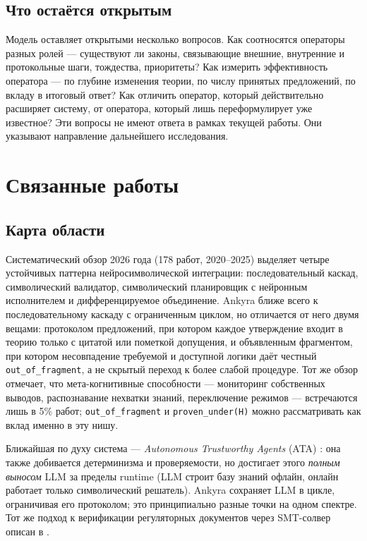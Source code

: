 \documentclass[12pt,a4paper]{article}
\begin{document}
\subsection{Что остаётся открытым}
\label{sec:open}

Модель оставляет открытыми несколько вопросов. Как соотносятся операторы разных ролей --- существуют
ли законы, связывающие внешние, внутренние и протокольные шаги, тождества, приоритеты? Как измерить 
эффективность оператора --- по глубине изменения теории, по числу принятых предложений, по вкладу
в итоговый ответ? Как отличить оператор, который действительно расширяет систему, от оператора,
который лишь переформулирует уже известное? Эти вопросы не имеют ответа в рамках текущей работы.
Они указывают направление дальнейшего исследования.

\section{Связанные работы}
\label{sec:related}

\subsection{Карта области}
\label{sec:map}

Систематический обзор 2026 года \cite{survey2026} (178 работ, 2020--2025) выделяет четыре устойчивых паттерна
нейросимволической интеграции: последовательный каскад, символический валидатор, символический
планировщик с нейронным исполнителем и дифференцируемое объединение. Ankyra ближе всего к
последовательному каскаду с ограниченным циклом, но отличается от него двумя вещами: протоколом
предложений, при котором каждое утверждение входит в теорию только с цитатой или пометкой допущения,
и объявленным фрагментом, при котором несовпадение требуемой и доступной логики даёт честный
\texttt{out\_of\_fragment}, а не скрытый переход к более слабой процедуре. Тот же обзор отмечает,
что мета-когнитивные способности --- мониторинг собственных выводов, распознавание нехватки знаний,
переключение режимов --- встречаются лишь в 5\% работ; \texttt{out\_of\_fragment} и
\texttt{proven\_under(H)} можно рассматривать как вклад именно в эту нишу.

Ближайшая по духу система --- \emph{Autonomous Trustworthy Agents} (ATA) \cite{ata}: она также добивается
детерминизма и проверяемости, но достигает этого \emph{полным выносом} LLM за пределы runtime
(LLM строит базу знаний офлайн, онлайн работает только символический решатель). Ankyra сохраняет LLM
в цикле, ограничивая его протоколом; это принципиально разные точки на одном спектре. Тот же подход
к верификации регуляторных документов через SMT-солвер описан в \cite{nsc}.
\end{document}
